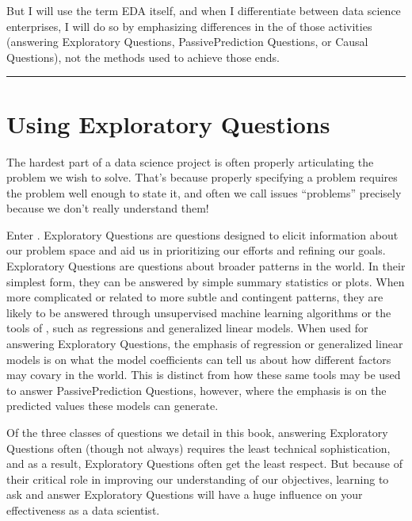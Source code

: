 \documentclass[letterpaper,10pt,english]{jupyterBook}
\begin{document}
\sphinxAtStartPar
But I will  use the term EDA itself, and when I differentiate between data science enterprises, I will do so by emphasizing differences in the  of those activities (answering Exploratory Questions, Passive\sphinxhyphen{}Prediction Questions, or Causal Questions), not the methods used to achieve those ends.


\bigskip\hrule\bigskip


\sphinxstepscope


\chapter{Using Exploratory Questions}
\label{\detokenize{30_questions/10_using_exploratory_questions:using-exploratory-questions}}\label{\detokenize{30_questions/10_using_exploratory_questions::doc}}
\sphinxAtStartPar
The hardest part of a data science project is often properly articulating the problem we wish to solve. That’s because properly specifying a problem requires  the problem well enough to state it, and often we call issues “problems” precisely because we don’t really understand them!

\sphinxAtStartPar
Enter . Exploratory Questions are questions designed to elicit information about our problem space and aid us in prioritizing our efforts and refining our goals. Exploratory Questions are questions about broader patterns in the world. In their simplest form, they can be answered by simple summary statistics or plots. When more complicated or related to more subtle and contingent patterns, they are likely to be answered through unsupervised machine learning algorithms or the tools of , such as regressions and generalized linear models. When used for answering Exploratory Questions, the emphasis of regression or generalized linear models is on what the model coefficients can tell us about how different factors may co\sphinxhyphen{}vary in the world. This is distinct from how these same tools may be used to answer Passive\sphinxhyphen{}Prediction Questions, however, where the emphasis is on the predicted values these models can generate.

\sphinxAtStartPar
Of the three classes of questions we detail in this book, answering Exploratory Questions often (though not always) requires the least technical sophistication, and as a result, Exploratory Questions often get the least respect. But because of their critical role in improving our understanding of our objectives, learning to ask and answer Exploratory Questions will have a huge influence on your effectiveness as a data scientist.
\end{document}
